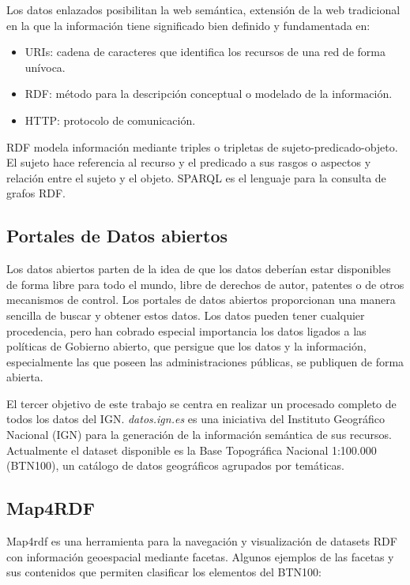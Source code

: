 Los datos enlazados posibilitan la web semántica, extensión de la web tradicional en la que la información tiene
significado bien definido\cite{semantic-web} y fundamentada en:
\begin{itemize}
    \item URIs: cadena de caracteres que identifica los recursos de una red de forma unívoca.
    \item RDF: método para la descripción conceptual o modelado de la información.
    \item HTTP: protocolo de comunicación.
\end{itemize}

RDF modela información mediante triples o tripletas de sujeto-predicado-objeto. El sujeto hace referencia al
recurso y el predicado a sus rasgos o aspectos y relación entre el sujeto y el objeto. SPARQL es el lenguaje para
la consulta de grafos RDF.

\subsection{Portales de Datos abiertos}

Los datos abiertos parten de la idea de que los datos deberían estar disponibles de forma libre para todo el
mundo, libre de derechos de autor, patentes o de otros mecanismos de control. Los portales de datos abiertos
proporcionan una manera sencilla de buscar y obtener estos datos. Los datos pueden tener cualquier procedencia,
pero han cobrado especial importancia los datos ligados a las políticas de Gobierno abierto, que persigue que los
datos y la información, especialmente las que poseen las administraciones públicas, se publiquen de forma
abierta. \cite{datos-madrid}

El tercer objetivo de este trabajo se centra en realizar un procesado completo de todos los datos del IGN.
\textit{datos.ign.es} es una iniciativa del Instituto Geográfico Nacional (IGN) para la generación de la información
semántica de sus recursos\cite{datos-ign}. Actualmente el dataset disponible es la Base Topográfica Nacional
1:100.000 (BTN100), un catálogo de datos geográficos agrupados por temáticas.

\subsection{Map4RDF}

Map4rdf es una herramienta para la navegación y visualización de datasets RDF con información geoespacial
mediante facetas\cite{map4rdf-paper}. Algunos ejemplos de las facetas y sus contenidos que permiten clasificar los elementos del
BTN100:

